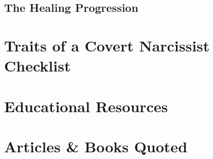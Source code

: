 \documentclass{article}
\numberwithin{equation}{section}
\begin{document}
\subsection{The Healing Progression}


\section{Traits of a Covert Narcissist Checklist}


\section{Educational Resources}


\section{Articles \& Books Quoted}


\printbibliography[heading=bibintoc]
	
\end{document}

